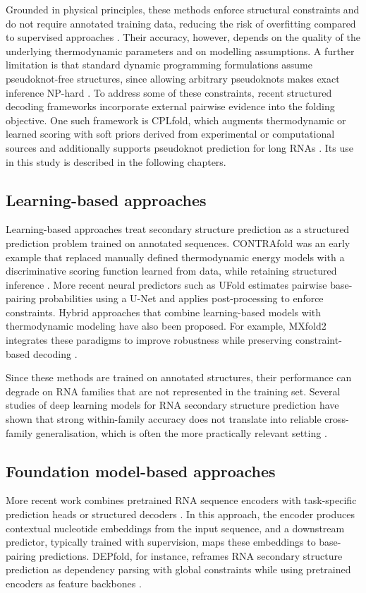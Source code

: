 \documentclass[logo,bsc,singlespacing,parskip]{infthesis}
\begin{document}
Grounded in physical principles, these methods enforce structural constraints and do not require annotated training data, reducing the risk of overfitting compared to supervised approaches \citep{mathews2019benchmark}. Their accuracy, however, depends on the quality of the underlying thermodynamic parameters and on modelling assumptions. A further limitation is that standard dynamic programming formulations assume pseudoknot-free structures, since allowing arbitrary pseudoknots makes exact inference NP-hard \citep{LyngsoPedersen2000}. To address some of these constraints, recent structured decoding frameworks incorporate external pairwise evidence into the folding objective. One such framework is CPLfold, which augments thermodynamic or learned scoring with soft priors derived from experimental or computational sources and additionally supports pseudoknot prediction for long RNAs \citep{wang2026cplfold}. Its use in this study is described in the following chapters.

\subsection{Learning-based approaches}
\label{sec:bg_supervised}
Learning-based approaches treat secondary structure prediction as a structured prediction problem trained on
annotated sequences. CONTRAfold was an early example that replaced manually defined thermodynamic energy models with a discriminative scoring function learned from data, while retaining structured inference \citep{do2006contrafold}.
More recent neural predictors such as UFold \citep{fu2022ufold} estimates pairwise base-pairing probabilities using a U-Net and applies post-processing to enforce constraints. Hybrid approaches that combine learning-based models with thermodynamic modeling have also been proposed. For example, MXfold2 integrates these paradigms to improve robustness while preserving constraint-based decoding \citep{sato2021mxfold2}.

Since these methods are trained on annotated structures, their performance can degrade on RNA families that are not represented in the training set. Several studies of deep learning models for RNA secondary structure prediction have shown that strong within-family accuracy does not translate into reliable cross-family generalisation, which is often the more practically relevant setting \citep{szikszai2022, szikszai2026gauging}.

\subsection{Foundation model-based approaches}
\label{sec:bg_fm_backed}
More recent work combines pretrained RNA sequence encoders with task-specific prediction heads or structured decoders \citep{tahmid2025birna, wang2024rnaernie}. In this approach, the encoder produces contextual nucleotide embeddings from the input sequence, and a downstream predictor, typically trained with supervision, maps these embeddings to base-pairing predictions. DEPfold, for instance, reframes RNA secondary structure prediction as dependency parsing with global constraints while using pretrained encoders as feature backbones \citep{wang2025depfold}. 
\end{document}
